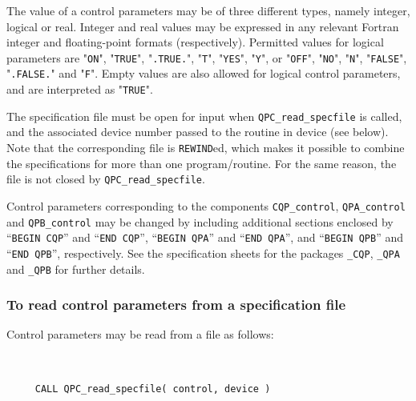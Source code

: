 \documentclass{galahad}
\newcommand{\packagename}{QPC}
\begin{document}
The value of a control parameters may be of three different types, namely
integer, logical or real.
Integer and real values may be expressed in any relevant Fortran integer and
floating-point formats (respectively). Permitted values for logical
parameters are "{\tt ON}", "{\tt TRUE}", "{\tt .TRUE.}", "{\tt T}", 
"{\tt YES}", "{\tt Y}", or "{\tt OFF}", "{\tt NO}",
"{\tt N}", "{\tt FALSE}", "{\tt .FALSE.}" and "{\tt F}". 
Empty values are also allowed for 
logical control parameters, and are interpreted as "{\tt TRUE}".  

The specification file must be open for 
input when {\tt \packagename\_read\_specfile}
is called, and the associated device number 
passed to the routine in device (see below). 
Note that the corresponding 
file is {\tt REWIND}ed, which makes it possible to combine the specifications 
for more than one program/routine.  For the same reason, the file is not
closed by {\tt \packagename\_read\_specfile}.

Control parameters corresponding to the components 
{\tt CQP\_control}, {\tt QPA\_control}
and
{\tt QPB\_control} may be changed by including additional sections enclosed by
``{\tt BEGIN CQP}'' and 
``{\tt END CQP}'',
``{\tt BEGIN QPA}'' and 
``{\tt END QPA}'', and
``{\tt BEGIN QPB}'' and 
``{\tt END QPB}'', respectively. 
See the specification sheets for the packages 
{\tt \libraryname\_CQP},
{\tt \libraryname\_QPA} 
and
{\tt \libraryname\_QPB}
for further details.

\subsubsection{To read control parameters from a specification file}
\label{readspec}

Control parameters may be read from a file as follows:
\hskip0.5in 

\def\baselinestretch{0.8}
{\tt 
\begin{verbatim}
     CALL QPC_read_specfile( control, device )
\end{verbatim}
}
\def\baselinestretch{1.0}
\end{document}
